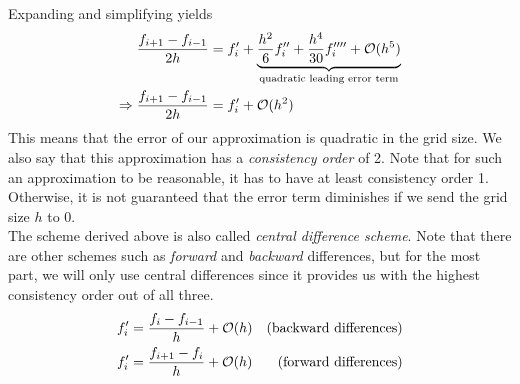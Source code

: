 Expanding and simplifying yields
\begin{align}
        \frac{f_{i+1} - f_{i-1}}{2h} &= f_i' + \underbrace{\frac{h^2}{6}f_i'' + \frac{h^4}{30}f_i'''' +
        \mathcal{O}(h^5)}_\text{quadratic leading error term}\notag\\
            \Rightarrow \frac{f_{i+1} - f_{i-1}}{2h} &= f_i' + \mathcal{O}(h^2)
\end{align}
This means that the error of our approximation is quadratic in the grid size. 
We also say that this approximation has a \textit{consistency order} of 2. Note that for such an
approximation to be reasonable, it has to have at least consistency order 1. Otherwise, it is
not guaranteed that the error term diminishes if we send the grid size $h$ to 0.\\
The scheme derived above is also called \textit{central difference scheme}. Note that there are
other schemes such as \textit{forward} and \textit{backward} differences, but for the most part, we
will only use central differences since it provides us with the highest consistency
order out of all three. 
\begin{align}
    f_i' &= \frac{f_i - f_{i-1}}{h} + \mathcal{O}(h)&\textnormal{(backward differences)}\notag\\
    f_i' &= \frac{f_{i+1} - f_i}{h} + \mathcal{O}(h)&\textnormal{(forward differences)}\notag
\end{align}
